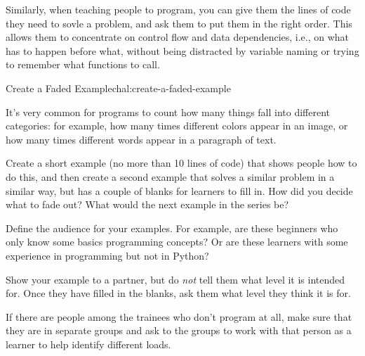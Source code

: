 Similarly, when teaching people to program, you can give them the
lines of code they need to sovle a problem, and ask them to put them
in the right order.  This allows them to concentrate on control flow
and data dependencies, i.e., on what has to happen before what,
without being distracted by variable naming or trying to remember what
functions to call.

\begin{challenge}{Create a Faded Example}{chal:create-a-faded-example}

It's very common for programs to count how many things fall into
different categories: for example, how many times different colors
appear in an image, or how many times different words appear in a
paragraph of text.

\begin{genumerate}

\item
  Create a short example (no more than 10 lines of code) that shows
  people how to do this, and then create a second example that solves
  a similar problem in a similar way, but has a couple of blanks for
  learners to fill in.  How did you decide what to fade out?  What
  would the next example in the series be?

\item
  Define the audience for your examples. For example, are these
  beginners who only know some basics programming concepts? Or are
  these learners with some experience in programming but not in
  Python?

\item
  Show your example to a partner, but do \emph{not} tell them what
  level it is intended for.  Once they have filled in the blanks, ask
  them what level they think it is for.

\end{genumerate}

If there are people among the trainees who don't program at all, make
sure that they are in separate groups and ask to the groups to work
with that person as a learner to help identify different loads.

\end{challenge}

